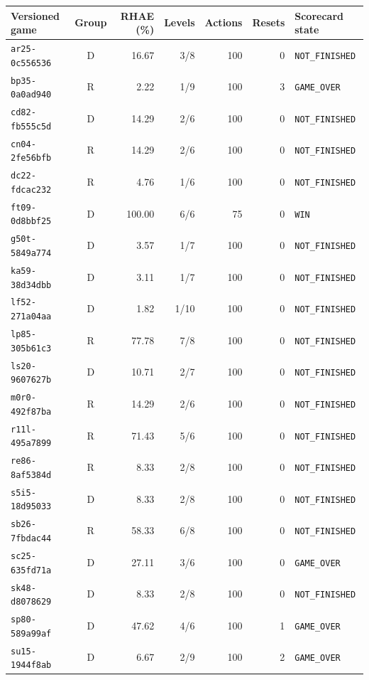 \begin{table}[H]
\centering\small
\setlength{\tabcolsep}{4pt}
\begin{tabularx}{\linewidth}{@{}lcrrrrY@{}}\toprule
Versioned game & Group & RHAE (\%) & Levels & Actions & Resets & Scorecard state\\\midrule
\texttt{ar25-0c556536} & D & 16.67 & 3/8 & 100 & 0 & \texttt{NOT\_FINISHED}\\
\texttt{bp35-0a0ad940} & R & 2.22 & 1/9 & 100 & 3 & \texttt{GAME\_OVER}\\
\texttt{cd82-fb555c5d} & D & 14.29 & 2/6 & 100 & 0 & \texttt{NOT\_FINISHED}\\
\texttt{cn04-2fe56bfb} & R & 14.29 & 2/6 & 100 & 0 & \texttt{NOT\_FINISHED}\\
\texttt{dc22-fdcac232} & R & 4.76 & 1/6 & 100 & 0 & \texttt{NOT\_FINISHED}\\
\texttt{ft09-0d8bbf25} & D & 100.00 & 6/6 & 75 & 0 & \texttt{WIN}\\
\texttt{g50t-5849a774} & D & 3.57 & 1/7 & 100 & 0 & \texttt{NOT\_FINISHED}\\
\texttt{ka59-38d34dbb} & D & 3.11 & 1/7 & 100 & 0 & \texttt{NOT\_FINISHED}\\
\texttt{lf52-271a04aa} & D & 1.82 & 1/10 & 100 & 0 & \texttt{NOT\_FINISHED}\\
\texttt{lp85-305b61c3} & R & 77.78 & 7/8 & 100 & 0 & \texttt{NOT\_FINISHED}\\
\texttt{ls20-9607627b} & D & 10.71 & 2/7 & 100 & 0 & \texttt{NOT\_FINISHED}\\
\texttt{m0r0-492f87ba} & R & 14.29 & 2/6 & 100 & 0 & \texttt{NOT\_FINISHED}\\
\texttt{r11l-495a7899} & R & 71.43 & 5/6 & 100 & 0 & \texttt{NOT\_FINISHED}\\
\texttt{re86-8af5384d} & R & 8.33 & 2/8 & 100 & 0 & \texttt{NOT\_FINISHED}\\
\texttt{s5i5-18d95033} & D & 8.33 & 2/8 & 100 & 0 & \texttt{NOT\_FINISHED}\\
\texttt{sb26-7fbdac44} & R & 58.33 & 6/8 & 100 & 0 & \texttt{NOT\_FINISHED}\\
\texttt{sc25-635fd71a} & D & 27.11 & 3/6 & 100 & 0 & \texttt{GAME\_OVER}\\
\texttt{sk48-d8078629} & D & 8.33 & 2/8 & 100 & 0 & \texttt{NOT\_FINISHED}\\
\texttt{sp80-589a99af} & D & 47.62 & 4/6 & 100 & 1 & \texttt{GAME\_OVER}\\
\texttt{su15-1944f8ab} & D & 6.67 & 2/9 & 100 & 2 & \texttt{GAME\_OVER}\\

\end{tabularx}
\end{table}
